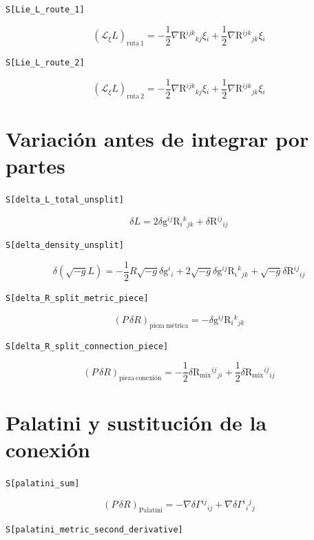 \documentclass[11pt,a4paper]{article}
\begin{document}
\noindent\texttt{S[Lie\_L\_route\_1]}

\[
\boxed{\left(\mathcal{L}_{\xi}L\right)_{\mathrm{ruta\ 1}} = -\frac{1}{2}\nabla \mathrm{R}{}^{ijk}{}_{kj}\xi{}_{i} + \frac{1}{2}\nabla \mathrm{R}{}^{ijk}{}_{jk}\xi{}_{i}}
\]


\noindent\texttt{S[Lie\_L\_route\_2]}

\[
\boxed{\left(\mathcal{L}_{\xi}L\right)_{\mathrm{ruta\ 2}} = -\frac{1}{2}\nabla \mathrm{R}{}^{ijk}{}_{kj}\xi{}_{i} + \frac{1}{2}\nabla \mathrm{R}{}^{ijk}{}_{jk}\xi{}_{i}}
\]


\section*{Variación antes de integrar por partes}

\noindent\texttt{S[delta\_L\_total\_unsplit]}

\[
\boxed{\delta L = 2\delta \mathrm{g}{}^{ij}\mathrm{R}{}_{i}{}^{k}{}_{jk} + \delta \mathrm{R}{}^{ij}{}_{ij}}
\]


\noindent\texttt{S[delta\_density\_unsplit]}

\[
\boxed{\delta\!\left(\sqrt{-g}L\right) = -\frac{1}{2}R\sqrt{-g}\delta \mathrm{g}{}^{i}{}_{i} + 2\sqrt{-g}\delta \mathrm{g}{}^{ij}\mathrm{R}{}_{i}{}^{k}{}_{jk} + \sqrt{-g}\delta \mathrm{R}{}^{ij}{}_{ij}}
\]


\noindent\texttt{S[delta\_R\_split\_metric\_piece]}

\[
\boxed{\left(P\,\delta R\right)_{\mathrm{pieza\ métrica}} = -\delta \mathrm{g}{}^{ij}\mathrm{R}{}_{i}{}^{k}{}_{jk}}
\]


\noindent\texttt{S[delta\_R\_split\_connection\_piece]}

\[
\boxed{\left(P\,\delta R\right)_{\mathrm{pieza\ conexión}} = -\frac{1}{2}\delta \mathrm{R}_{\mathrm{mix}}{}^{ij}{}_{ji} + \frac{1}{2}\delta \mathrm{R}_{\mathrm{mix}}{}^{ij}{}_{ij}}
\]


\section*{Palatini y sustitución de la conexión}

\noindent\texttt{S[palatini\_sum]}

\[
\boxed{\left(P\,\delta R\right)_{\mathrm{Palatini}} = -\nabla\delta\Gamma{}^{ij}{}_{ij} + \nabla\delta\Gamma{}^{i}{}_{i}{}^{j}{}_{j}}
\]


\noindent\texttt{S[palatini\_metric\_second\_derivative]}
\end{document}
